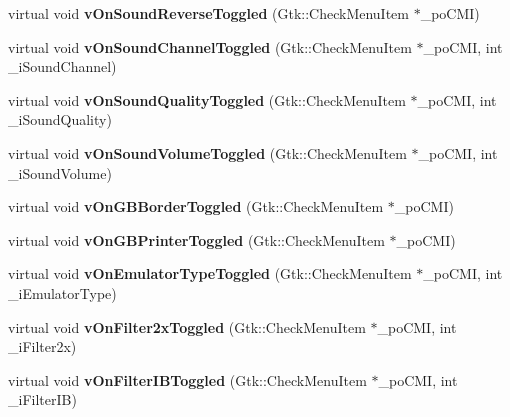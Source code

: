 \begin{DoxyCompactItemize}
virtual void {\bfseries v\+On\+Sound\+Reverse\+Toggled} (Gtk\+::\+Check\+Menu\+Item $\ast$\+\_\+po\+C\+MI)
\item 
\mbox{\label{class_v_b_a_1_1_window_aa64899ec70d7a82ab4eee24567585f3b}} 
virtual void {\bfseries v\+On\+Sound\+Channel\+Toggled} (Gtk\+::\+Check\+Menu\+Item $\ast$\+\_\+po\+C\+MI, int \+\_\+i\+Sound\+Channel)
\item 
\mbox{\label{class_v_b_a_1_1_window_ae0ea496e382a463114dab0895698fed7}} 
virtual void {\bfseries v\+On\+Sound\+Quality\+Toggled} (Gtk\+::\+Check\+Menu\+Item $\ast$\+\_\+po\+C\+MI, int \+\_\+i\+Sound\+Quality)
\item 
\mbox{\label{class_v_b_a_1_1_window_a6e1456ec5b5efc3a5e24d91ed918d503}} 
virtual void {\bfseries v\+On\+Sound\+Volume\+Toggled} (Gtk\+::\+Check\+Menu\+Item $\ast$\+\_\+po\+C\+MI, int \+\_\+i\+Sound\+Volume)
\item 
\mbox{\label{class_v_b_a_1_1_window_aa7cf1b717713eb050de751b12ddfe72a}} 
virtual void {\bfseries v\+On\+G\+B\+Border\+Toggled} (Gtk\+::\+Check\+Menu\+Item $\ast$\+\_\+po\+C\+MI)
\item 
\mbox{\label{class_v_b_a_1_1_window_a2d6e4c0bd7467305b02bd6f5b0343f26}} 
virtual void {\bfseries v\+On\+G\+B\+Printer\+Toggled} (Gtk\+::\+Check\+Menu\+Item $\ast$\+\_\+po\+C\+MI)
\item 
\mbox{\label{class_v_b_a_1_1_window_a223cab540dae446895699f2ca1494f8e}} 
virtual void {\bfseries v\+On\+Emulator\+Type\+Toggled} (Gtk\+::\+Check\+Menu\+Item $\ast$\+\_\+po\+C\+MI, int \+\_\+i\+Emulator\+Type)
\item 
\mbox{\label{class_v_b_a_1_1_window_ad73fe13a9e4c8b40fbe6f0726210cc5c}} 
virtual void {\bfseries v\+On\+Filter2x\+Toggled} (Gtk\+::\+Check\+Menu\+Item $\ast$\+\_\+po\+C\+MI, int \+\_\+i\+Filter2x)
\item 
\mbox{\label{class_v_b_a_1_1_window_afddc93921e9561601104184bb16941e5}} 
virtual void {\bfseries v\+On\+Filter\+I\+B\+Toggled} (Gtk\+::\+Check\+Menu\+Item $\ast$\+\_\+po\+C\+MI, int \+\_\+i\+Filter\+IB)

\end{DoxyCompactItemize}
